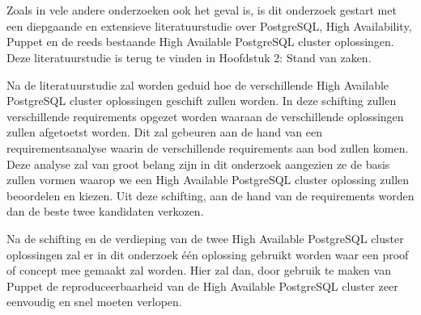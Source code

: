 
\chapter{}
\label{ch:methodologie}


Zoals in vele andere onderzoeken ook het geval is, is dit onderzoek gestart met een diepgaande en extensieve literatuurstudie over PostgreSQL, High Availability, Puppet en de reeds bestaande High Available PostgreSQL cluster oplossingen. Deze literatuurstudie is terug te vinden in Hoofdstuk 2: Stand van zaken.

Na de literatuurstudie zal worden geduid hoe de verschillende High Available PostgreSQL cluster oplossingen geschift zullen worden. In deze schifting zullen verschillende requirements opgezet worden waaraan de verschillende oplossingen zullen afgetoetst worden. Dit zal gebeuren aan de hand van een requirementsanalyse waarin de verschillende requirements aan bod zullen komen. Deze analyse zal van groot belang zijn in dit onderzoek aangezien ze de basis zullen vormen waarop we een High Available PostgreSQL cluster oplossing zullen beoordelen en kiezen.
Uit deze schifting, aan de hand van de requirements worden dan de beste twee kandidaten verkozen. %

Na de schifting en de verdieping van de twee High Available PostgreSQL cluster oplossingen zal er in dit onderzoek één oplossing gebruikt worden waar een proof of concept mee gemaakt zal worden. Hier zal dan, door gebruik te maken van Puppet de reproduceerbaarheid van de High Available PostgreSQL cluster zeer eenvoudig en snel moeten verlopen.


